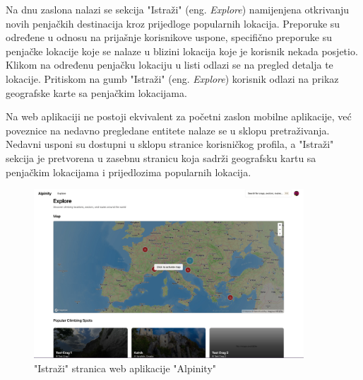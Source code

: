 Na dnu zaslona nalazi se sekcija "Istraži" (eng. \textit{Explore}) namijenjena otkrivanju novih penjačkih destinacija kroz prijedloge popularnih lokacija. Preporuke su određene u odnosu na prijašnje korisnikove uspone, specifično preporuke su penjačke lokacije koje se nalaze u blizini lokacija koje je korisnik nekada posjetio. Klikom na određenu penjačku lokaciju u listi odlazi se na pregled detalja te lokacije. Pritiskom na gumb "Istraži" (eng. \textit{Explore}) korisnik odlazi na prikaz geografske karte sa penjačkim lokacijama.

Na web aplikaciji ne postoji ekvivalent za početni zaslon mobilne aplikacije, već poveznice na nedavno pregledane entitete nalaze se u sklopu pretraživanja. Nedavni usponi su dostupni u sklopu stranice korisničkog profila, a "Istraži" sekcija je pretvorena u zasebnu stranicu koja sadrži geografsku kartu sa penjačkim lokacijama i prijedlozima popularnih lokacija.

\begin{figure}[H]
    \centering
    \includegraphics[width=0.9\textwidth]{images/implementacija/web/explore.jpeg}
    \caption{"Istraži" stranica web aplikacije "Alpinity"}
    \label{fig:istrazivanje_web}
\end{figure}